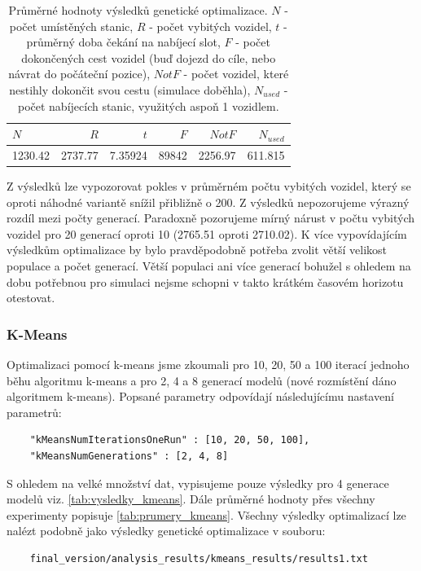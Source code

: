 \begin{table}
\centering\footnotesize\sf
\begin{tabular}{lrrrrr}
\toprule
$N$ & $R$ & $t$ & $F$ & $Not F$ & $N_{used}$ \\
\midrule
1230.42 & 2737.77 & 7.35924 & 89842 & 2256.97 & 611.815 \\
\bottomrule
\end{tabular}
\caption{Průměrné hodnoty výsledků genetické optimalizace.
$N$ - počet umístěných stanic, $R$ - počet vybitých vozidel, $t$ - průměrný doba čekání na nabíjecí slot, $F$ - počet dokončených
cest vozidel (buď dojezd do cíle, nebo návrat do počáteční pozice), $Not F$ - počet vozidel, které nestihly
dokončit svou cestu (simulace doběhla), $N_{used}$ - počet nabíjecích stanic, využitých aspoň 1 vozidlem.}
\label{tab:prumery_genetic}
\end{table}

Z výsledků lze vypozorovat pokles v průměrném počtu vybitých vozidel, který se oproti náhodné variantě snížil přibližně o 200.
Z výsledků nepozorujeme výrazný rozdíl mezi počty generací. Paradoxně pozorujeme mírný nárust v počtu vybitých vozidel 
pro 20 generací oproti 10 (2765.51 oproti 2710.02). K více vypovídajícím výsledkům optimalizace by
bylo pravděpodobně potřeba
zvolit větší velikost populace a počet generací. Větší populaci ani více generací bohužel s ohledem na dobu 
potřebnou pro simulaci nejsme schopni v takto krátkém časovém horizotu otestovat.


\subsubsection{K-Means}
Optimalizaci pomocí k-means jsme zkoumali pro 10, 20, 50 a 100 iterací jednoho běhu 
algoritmu k-means a pro 2, 4 a 8 generací modelů (nové rozmístění dáno algoritmem k-means).
Popsané parametry odpovídají následujícímu nastavení parametrů:

\begin{verbatim}
    "kMeansNumIterationsOneRun" : [10, 20, 50, 100],
    "kMeansNumGenerations" : [2, 4, 8]
\end{verbatim}

S ohledem na velké množství dat, vypisujeme pouze výsledky pro 4 generace modelů
viz. \cref{tab:vysledky_kmeans}. Dále průměrné hodnoty přes všechny experimenty popisuje
\cref{tab:prumery_kmeans}. Všechny výsledky optimalizací lze nalézt podobně
jako výsledky genetické optimalizace v souboru:

\begin{verbatim}
    final_version/analysis_results/kmeans_results/results1.txt
\end{verbatim}



